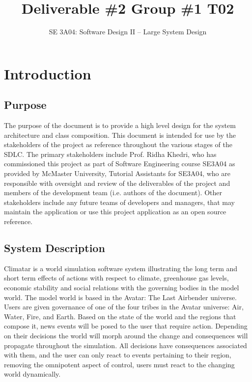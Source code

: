 \documentclass[]{article}
\title{Deliverable \#2 Group \#1 T02}
\author{SE 3A04: Software Design II -- Large System Design}
\date{}
\begin{document}
\maketitle

\section{Introduction}
\label{sec:introduction}

\subsection{Purpose}
\label{sub:purpose}
The purpose of the document is to provide a high level design for the system architecture and class composition. This document is intended for use by the stakeholders of the project as reference throughout the various stages of the SDLC. The primary stakeholders include Prof. Ridha Khedri, who has commissioned this project as part of Software Engineering course SE3A04 as provided by McMaster University, Tutorial Assistants for SE3A04, who are responsible with oversight and review of the deliverables of the project and members of the development team (i.e. authors of the document). Other stakeholders include any future teams of developers and managers, that may maintain the application or use this project application as an open source reference.


\subsection{System Description}
\label{sub:system_description}
Climatar is a world simulation software system illustrating the long term and short term effects of actions with respect to climate, greenhouse gas levels, economic stability and social relations with the governing bodies in the model world. The model world is based in the Avatar: The Last Airbender universe. Users are given governance of one of the four tribes in the Avatar universe: Air, Water, Fire, and Earth. Based on the state of the world and the regions that compose it, news events will be posed to the user that require action. Depending on their decisions the world will morph around the change and consequences will propagate throughout the simulation. All decisions have consequences associated with them, and the user can only react to events pertaining to their region, removing the omnipotent aspect of control, users must react to the changing world dynamically.
\end{document}
